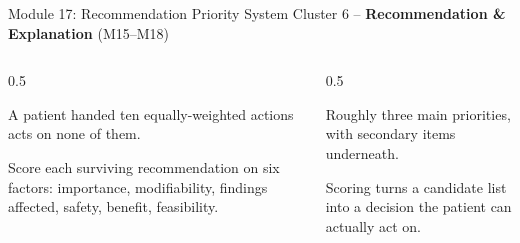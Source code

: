 \documentclass[9pt,aspectratio=169]{beamer}
\begin{document}
\begin{frame}{Module 17: Recommendation Priority System}
\textcolor{black!55}{\scriptsize Cluster 6 -- \textcolor{green!60!black}{\textbf{Recommendation \& Explanation}} (M15--M18)}\\[2pt]
\begin{columns}[T,onlytextwidth]
\begin{column}{0.5\textwidth}
\begin{tcolorbox}[colback=blue!7,colframe=blue!55!black,title=\textbf{Motivation},boxrule=0.6pt,arc=1mm,left=5pt,right=5pt,top=3pt,bottom=3pt,fonttitle=\small]
\footnotesize A patient handed ten equally-weighted actions acts on none of them.
\end{tcolorbox}
\vspace{5pt}
\begin{tcolorbox}[colback=teal!7,colframe=teal!55!black,title=\textbf{Method},boxrule=0.6pt,arc=1mm,left=5pt,right=5pt,top=3pt,bottom=3pt,fonttitle=\small]
\footnotesize Score each surviving recommendation on six factors: importance, modifiability, findings affected, safety, benefit, feasibility.
\end{tcolorbox}
\end{column}
\begin{column}{0.5\textwidth}
\begin{tcolorbox}[colback=green!8,colframe=green!45!black,title=\textbf{Result},boxrule=0.6pt,arc=1mm,left=5pt,right=5pt,top=3pt,bottom=3pt,fonttitle=\small]
\footnotesize Roughly three main priorities, with secondary items underneath.
\end{tcolorbox}
\vspace{5pt}
\begin{tcolorbox}[colback=orange!10,colframe=orange!65!black,title=\textbf{Conclusion},boxrule=0.6pt,arc=1mm,left=5pt,right=5pt,top=3pt,bottom=3pt,fonttitle=\small]
\footnotesize Scoring turns a candidate list into a decision the patient can actually act on.
\end{tcolorbox}
\end{column}
\end{columns}
\end{frame}
\end{document}
